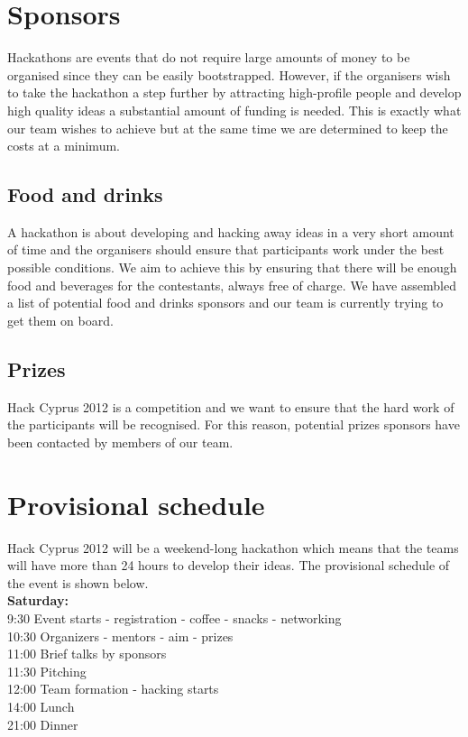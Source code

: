 \documentclass[a4paper,11pt]{report}
\begin{document}
\section{Sponsors}
Hackathons are events that do not require large amounts of money to be organised since they can be easily bootstrapped. However, if the organisers wish to take the hackathon a step further by attracting high-profile people and develop high quality ideas a substantial amount of funding is needed. This is exactly what our team wishes to achieve but at the same time we are determined to keep the costs at a minimum. 
 
\subsection{Food and drinks}
A hackathon is about developing and hacking away ideas in a very short amount of time and the organisers should ensure that participants work under the best possible conditions. We aim to achieve this by ensuring that there will be enough food and beverages for the contestants, always free of charge. We have assembled a list of potential food and drinks sponsors and our team is currently trying to get them on board.  

\subsection{Prizes}
Hack Cyprus 2012 is a competition and we want to ensure that the hard work of the participants will be recognised. For this reason, potential prizes sponsors have been contacted by members of our team. 

\section{Provisional schedule}
Hack Cyprus 2012 will be a weekend-long hackathon which means that the teams will have more than 24 hours to develop their ideas. The provisional schedule of the event is shown below. \\

\noindent\textbf{Saturday:}\\
9:30 Event starts - registration - coffee - snacks - networking\\
10:30 Organizers - mentors - aim - prizes\\
11:00 Brief talks by sponsors\\
11:30 Pitching\\
12:00 Team formation - hacking starts\\
14:00 Lunch\\
21:00 Dinner\\
\end{document}
